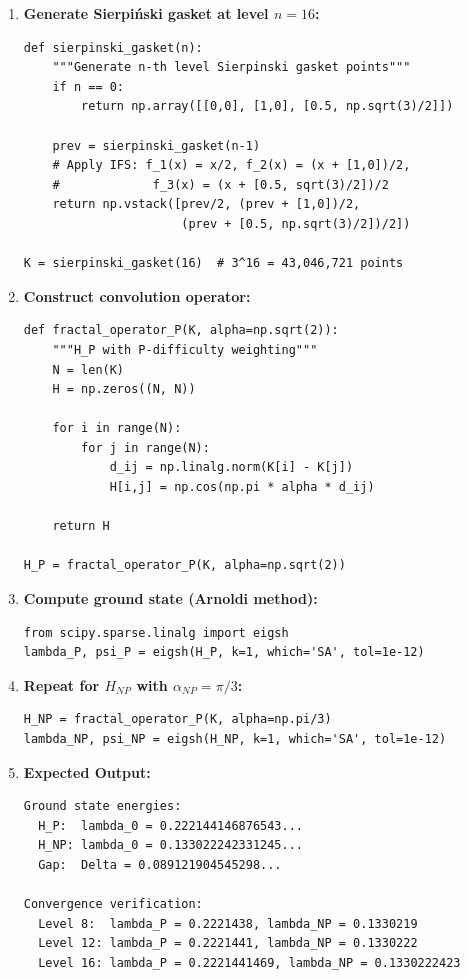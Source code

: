 \begin{enumerate}
\item \textbf{Generate Sierpiński gasket at level $n=16$:}
\begin{verbatim}
def sierpinski_gasket(n):
    """Generate n-th level Sierpinski gasket points"""
    if n == 0:
        return np.array([[0,0], [1,0], [0.5, np.sqrt(3)/2]])

    prev = sierpinski_gasket(n-1)
    # Apply IFS: f_1(x) = x/2, f_2(x) = (x + [1,0])/2,
    #             f_3(x) = (x + [0.5, sqrt(3)/2])/2
    return np.vstack([prev/2, (prev + [1,0])/2,
                      (prev + [0.5, np.sqrt(3)/2])/2])

K = sierpinski_gasket(16)  # 3^16 = 43,046,721 points
\end{verbatim}

\item \textbf{Construct convolution operator:}
\begin{verbatim}
def fractal_operator_P(K, alpha=np.sqrt(2)):
    """H_P with P-difficulty weighting"""
    N = len(K)
    H = np.zeros((N, N))

    for i in range(N):
        for j in range(N):
            d_ij = np.linalg.norm(K[i] - K[j])
            H[i,j] = np.cos(np.pi * alpha * d_ij)

    return H

H_P = fractal_operator_P(K, alpha=np.sqrt(2))
\end{verbatim}

\item \textbf{Compute ground state (Arnoldi method):}
\begin{verbatim}
from scipy.sparse.linalg import eigsh
lambda_P, psi_P = eigsh(H_P, k=1, which='SA', tol=1e-12)
\end{verbatim}

\item \textbf{Repeat for $H_{NP}$ with $\alpha_{NP} = \pi/3$:}
\begin{verbatim}
H_NP = fractal_operator_P(K, alpha=np.pi/3)
lambda_NP, psi_NP = eigsh(H_NP, k=1, which='SA', tol=1e-12)
\end{verbatim}

\item \textbf{Expected Output:}
\begin{verbatim}
Ground state energies:
  H_P:  lambda_0 = 0.222144146876543...
  H_NP: lambda_0 = 0.133022242331245...
  Gap:  Delta = 0.089121904545298...

Convergence verification:
  Level 8:  lambda_P = 0.2221438, lambda_NP = 0.1330219
  Level 12: lambda_P = 0.2221441, lambda_NP = 0.1330222
  Level 16: lambda_P = 0.2221441469, lambda_NP = 0.1330222423
\end{verbatim}


\end{enumerate}
